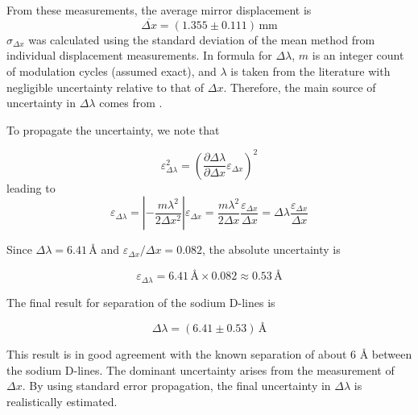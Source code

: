 From these measurements, the average mirror displacement is
\[
\overline{\Delta x} = (1.355 \pm 0.111)\,\text{mm}
\]
\(\sigma_{\Delta x}\) was calculated using the standard deviation of the mean method from individual displacement measurements.
In formula for \(\Delta \lambda\), \noindent
$m$ is an integer count of modulation cycles (assumed exact), and 
$\lambda$ is taken from the literature with negligible uncertainty relative to that of $\Delta x$. Therefore, the main source of uncertainty in 
$\Delta\lambda$ comes from .

\medskip

To propagate the uncertainty, we note that

\[
\varepsilon_{\Delta \lambda}^2 = \left(\frac{\partial \Delta \lambda}{\partial \Delta x}\varepsilon_{\Delta x}\right)^2
\] leading to
\[
\varepsilon_{\Delta \lambda} = \left|-\frac{m \lambda^2}{2 \Delta x^2}\right|\varepsilon_{\Delta x} = \frac{m \lambda^2}{2 \Delta x}\frac{\varepsilon_{\Delta x}}{\Delta x}=\Delta \lambda \frac{\varepsilon_{\Delta x}}{\Delta x}
\]


Since \(\Delta \lambda = 6.41\, \text{Å}\) and \(\varepsilon_{\Delta x}/\Delta x = 0.082\), the absolute uncertainty is

\[
\varepsilon_{\Delta \lambda} =  6.41\,\text{Å} \times 0.082 \approx 0.53\,\text{Å}
\]

The final result for separation of the sodium D-lines is

\[
\Delta \lambda = (6.41 \pm 0.53)\,\text{Å}
\]

This result is in good agreement with the known separation of about 6 Å between the sodium D-lines. The dominant uncertainty arises from the measurement of \(\Delta x\). By using standard error propagation, the final uncertainty in \(\Delta \lambda\) is realistically estimated.

